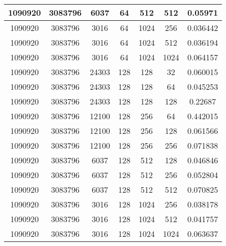 \documentclass[9pt]{article}
\begin{document}
\begin{tabular}{|c|c|c|c|c|c|c| }
\hline
1090920  & 3083796  & 6037  & 64  & 512  & 512  & 0.05971 \\
\hline
1090920  & 3083796  & 3016  & 64  & 1024  & 256  & 0.036442 \\
\hline
1090920  & 3083796  & 3016  & 64  & 1024  & 512  & 0.036194 \\
\hline
1090920  & 3083796  & 3016  & 64  & 1024  & 1024  & 0.064157 \\
\hline
1090920  & 3083796  & 24303  & 128  & 128  & 32  & 0.060015 \\
\hline
1090920  & 3083796  & 24303  & 128  & 128  & 64  & 0.045253 \\
\hline
1090920  & 3083796  & 24303  & 128  & 128  & 128  & 0.22687 \\
\hline
1090920  & 3083796  & 12100  & 128  & 256  & 64  & 0.442015 \\
\hline
1090920  & 3083796  & 12100  & 128  & 256  & 128  & 0.061566 \\
\hline
1090920  & 3083796  & 12100  & 128  & 256  & 256  & 0.071838 \\
\hline
1090920  & 3083796  & 6037  & 128  & 512  & 128  & 0.046846 \\
\hline
1090920  & 3083796  & 6037  & 128  & 512  & 256  & 0.052804 \\
\hline
1090920  & 3083796  & 6037  & 128  & 512  & 512  & 0.070825 \\
\hline
1090920  & 3083796  & 3016  & 128  & 1024  & 256  & 0.038178 \\
\hline
1090920  & 3083796  & 3016  & 128  & 1024  & 512  & 0.041757 \\
\hline
1090920  & 3083796  & 3016  & 128  & 1024  & 1024  & 0.063637 \\
\hline
\end{tabular}
 
\end{document}
